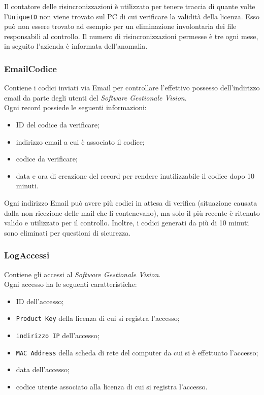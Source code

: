 Il contatore delle risincronizzazioni è utilizzato per tenere traccia di quante volte l'\texttt{UniqueID} non viene trovato sul PC di cui verificare la validità della licenza. Esso può non essere trovato ad esempio per un eliminazione involontaria dei file responsabili al controllo. Il numero di risincronizzazioni permesse è tre ogni mese, in seguito l'azienda è informata dell'anomalia.


\subsubsection{EmailCodice}

Contiene i codici inviati via Email per controllare l’effettivo possesso dell’indirizzo email da parte degli utenti del \textit{Software Gestionale Vision}.
\\Ogni record possiede le seguenti informazioni:

\begin{itemize}
\item ID del codice da verificare;
\item indirizzo email a cui è associato il codice;
\item codice da verificare;
\item data e ora di creazione del record per rendere inutilizzabile il codice dopo 10 minuti.
\end{itemize}

Ogni indirizzo Email può avere più codici in attesa di verifica (situazione causata dalla non ricezione delle mail che li contenevano), ma solo il più recente è ritenuto valido e utilizzato per il controllo. Inoltre, i codici generati da più di 10 minuti sono eliminati per questioni di sicurezza.

\subsubsection{LogAccessi}

Contiene gli accessi al \textit{Software Gestionale Vision}.
\\Ogni accesso ha le seguenti caratteristiche:

\begin{itemize}
\item ID dell'accesso;
\item \texttt{Product Key} della licenza di cui si registra l'accesso;
\item \texttt{indirizzo IP} dell'accesso;
\item \texttt{MAC Address} della scheda di rete del computer da cui si è effettuato l'accesso;
\item data dell'accesso;
\item codice utente associato alla licenza di cui si registra l'accesso.
\end{itemize}

